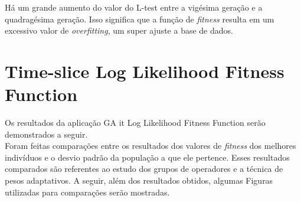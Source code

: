 Há um grande aumento do valor do L-test entre a vigésima geração e a quadragésima geração. Isso significa que a função de {\it fitness} resulta em um excessivo valor de {\it overfitting}, um super ajuste a base de dados.\\



%
%
%

\section{Time-slice Log Likelihood Fitness Function}

Os resultados da aplicação GA {it Log Likelihood  Fitness Function} serão demonstrados a seguir.\\

Foram feitas comparações entre os resultados dos valores de {\it fitness} dos melhores indivíduos e o desvio padrão da população a que ele pertence. Esses resultados comparados são referentes ao estudo dos grupos de operadores e a técnica de pesos adaptativos. A seguir, além dos resultados obtidos, algumas Figuras utilizadas para comparações serão mostradas.\\

